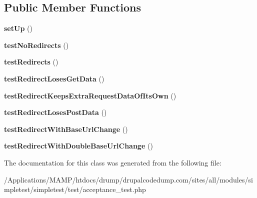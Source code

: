 \subsection*{Public Member Functions}
\begin{DoxyCompactItemize}
\item 
\hypertarget{class_test_of_live_redirects_a1416acf3fa7327dad9940183d74af9f9}{
{\bfseries setUp} ()}
\label{class_test_of_live_redirects_a1416acf3fa7327dad9940183d74af9f9}

\item 
\hypertarget{class_test_of_live_redirects_a280ac87e66b7b501110c76c0e8750c41}{
{\bfseries testNoRedirects} ()}
\label{class_test_of_live_redirects_a280ac87e66b7b501110c76c0e8750c41}

\item 
\hypertarget{class_test_of_live_redirects_a7908fead9ddcd10348afe781a421495e}{
{\bfseries testRedirects} ()}
\label{class_test_of_live_redirects_a7908fead9ddcd10348afe781a421495e}

\item 
\hypertarget{class_test_of_live_redirects_a6a092cc343af3f74ce9d5669e2b046a0}{
{\bfseries testRedirectLosesGetData} ()}
\label{class_test_of_live_redirects_a6a092cc343af3f74ce9d5669e2b046a0}

\item 
\hypertarget{class_test_of_live_redirects_a70544506c85e6b64facb273c0121bf8e}{
{\bfseries testRedirectKeepsExtraRequestDataOfItsOwn} ()}
\label{class_test_of_live_redirects_a70544506c85e6b64facb273c0121bf8e}

\item 
\hypertarget{class_test_of_live_redirects_a08f4d0064f5115309961c7d5966dde67}{
{\bfseries testRedirectLosesPostData} ()}
\label{class_test_of_live_redirects_a08f4d0064f5115309961c7d5966dde67}

\item 
\hypertarget{class_test_of_live_redirects_a971e3d4ade32bd58ec56c45ff619a1d5}{
{\bfseries testRedirectWithBaseUrlChange} ()}
\label{class_test_of_live_redirects_a971e3d4ade32bd58ec56c45ff619a1d5}

\item 
\hypertarget{class_test_of_live_redirects_a8b13c430be709f5467e32be6343ec16e}{
{\bfseries testRedirectWithDoubleBaseUrlChange} ()}
\label{class_test_of_live_redirects_a8b13c430be709f5467e32be6343ec16e}

\end{DoxyCompactItemize}


The documentation for this class was generated from the following file:\begin{DoxyCompactItemize}
\item 
/Applications/MAMP/htdocs/drump/drupalcodedump.com/sites/all/modules/simpletest/simpletest/test/acceptance\_\-test.php\end{DoxyCompactItemize}
